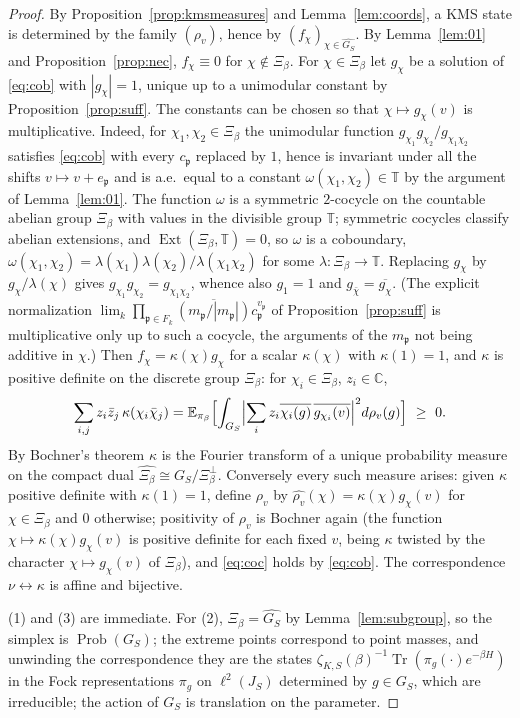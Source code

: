 \documentclass[11pt]{amsart}
\numberwithin{equation}{section}
\theoremstyle{definition}
\theoremstyle{remark}
\newcommand{\C}{\mathbb{C}}
\newcommand{\T}{\mathbb{T}}
\newcommand{\Prob}{\operatorname{Prob}}
\newcommand{\pp}{\mathfrak{p}}
\begin{document}
\begin{proof}
By Proposition~\ref{prop:kmsmeasures} and Lemma~\ref{lem:coords}, a KMS state
is determined by the family $(\rho_v)$, hence by $(f_\chi)_{\chi\in\widehat{G_S}}$.
By Lemma~\ref{lem:01} and Proposition~\ref{prop:nec}, $f_\chi\equiv0$ for
$\chi\notin\Xi_\beta$. For $\chi\in\Xi_\beta$ let $g_\chi$ be a solution of \eqref{eq:cob} with $|g_\chi|=1$,
unique up to a unimodular constant by Proposition~\ref{prop:suff}. The constants can be
chosen so that $\chi\mapsto g_\chi(v)$ is multiplicative. Indeed, for
$\chi_1,\chi_2\in\Xi_\beta$ the unimodular function $g_{\chi_1}g_{\chi_2}/g_{\chi_1\chi_2}$
satisfies \eqref{eq:cob} with every $c_\pp$ replaced by $1$, hence is invariant under all the
shifts $v\mapsto v+e_\pp$ and is a.e.\ equal to a constant $\omega(\chi_1,\chi_2)\in\T$ by
the argument of Lemma~\ref{lem:01}. The function $\omega$ is a symmetric $2$-cocycle on the
countable abelian group $\Xi_\beta$ with values in the divisible group $\T$; symmetric
cocycles classify abelian extensions, and $\operatorname{Ext}(\Xi_\beta,\T)=0$, so $\omega$
is a coboundary, $\omega(\chi_1,\chi_2)=\lambda(\chi_1)\lambda(\chi_2)/\lambda(\chi_1\chi_2)$
for some $\lambda:\Xi_\beta\to\T$. Replacing $g_\chi$ by $g_\chi/\lambda(\chi)$ gives
$g_{\chi_1}g_{\chi_2}=g_{\chi_1\chi_2}$, whence also $g_1=1$ and
$g_{\bar\chi}=\overline{g_\chi}$. (The explicit normalization
$\lim_k\prod_{\pp\in F_k}\overline{(m_\pp/|m_\pp|)}c_\pp^{v_\pp}$ of
Proposition~\ref{prop:suff} is multiplicative only up to such a cocycle, the arguments of
the $m_\pp$ not being additive in $\chi$.) Then
$f_\chi=\kappa(\chi)g_\chi$ for a scalar $\kappa(\chi)$ with $\kappa(1)=1$, and
$\kappa$ is positive definite on the discrete group $\Xi_\beta$: for
$\chi_i\in\Xi_\beta$, $z_i\in\C$,
\[
\sum_{i,j}z_i\bar z_j\,\kappa(\chi_i\bar\chi_j)
=\mathbb E_{\pi_\beta}\Bigl[\int_{G_S}\Bigl|\sum_iz_i\overline{\chi_i(g)}\,\overline{g_{\chi_i}(v)}\Bigr|^2d\rho_v(g)\Bigr]\ \ge\ 0 .
\]
By Bochner's theorem $\kappa$ is the Fourier transform of a unique probability
measure on the compact dual $\widehat{\Xi_\beta}\cong G_S/\Xi_\beta^\perp$.
Conversely every such measure arises: given $\kappa$ positive definite with
$\kappa(1)=1$, define $\rho_v$ by
$\widehat{\rho_v}(\chi)=\kappa(\chi)g_\chi(v)$ for $\chi\in\Xi_\beta$ and $0$
otherwise; positivity of $\rho_v$ is Bochner again (the function
$\chi\mapsto\kappa(\chi)g_\chi(v)$ is positive definite for each fixed $v$,
being $\kappa$ twisted by the character $\chi\mapsto g_\chi(v)$ of
$\Xi_\beta$), and \eqref{eq:coc} holds by \eqref{eq:cob}. The correspondence
$\nu\leftrightarrow\kappa$ is affine and bijective.

(1) and (3) are immediate. For (2), $\Xi_\beta=\widehat{G_S}$ by
Lemma~\ref{lem:subgroup}, so the simplex is $\Prob(G_S)$; the extreme points
correspond to point masses, and unwinding the correspondence they are the
states $\zeta_{K,S}(\beta)^{-1}\operatorname{Tr}(\pi_g(\cdot)e^{-\beta H})$ in
the Fock representations $\pi_g$ on $\ell^2(J_S)$ determined by $g\in G_S$,
which are irreducible; the action of $G_S$ is translation on the parameter.
\end{proof}
\end{document}
